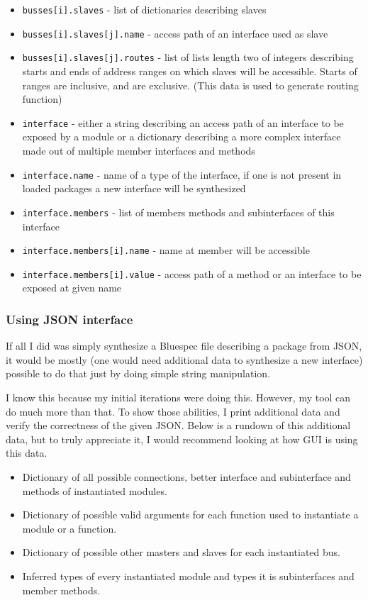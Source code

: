 \documentclass[12pt]{report}
\begin{document}
\begin{itemize}
   \item \verb!busses[i].slaves! - list of dictionaries describing slaves 
   \item \verb!busses[i].slaves[j].name! - access path of an interface used as slave 
   \item \verb!busses[i].slaves[j].routes! - list of lists length two of integers describing starts and ends of address ranges on which slaves will be accessible. Starts of ranges are inclusive, and are exclusive. (This data is used to generate routing function) 
   \item \verb!interface! - either a string describing an access path of an interface to be exposed by a module or a dictionary describing a more complex interface made out of multiple member interfaces and methods 
   \item \verb!interface.name! - name of a type of the interface, if one is not present in loaded packages a new interface will be synthesized 
   \item \verb!interface.members! - list of members methods and subinterfaces of this interface 
   \item \verb!interface.members[i].name! - name at member will be accessible 
   \item \verb!interface.members[i].value! - access path of a method or an interface to be exposed at given name  
\end{itemize} 


\subsubsection{Using JSON interface}

If all I did was simply synthesize a Bluespec file describing a package from JSON, it would be mostly (one would need additional data to synthesize a new interface) possible to do that just by doing simple string manipulation.

I know this because my initial iterations were doing this. However, my tool can do much more than that. To show those abilities, I print additional data and verify the correctness of the given JSON. Below is a rundown of this additional data, but to truly appreciate it, I would recommend looking at how GUI is using this data.

\begin{itemize}
\item Dictionary of all possible connections, better interface and subinterface and methods of instantiated modules.
\item Dictionary of possible valid arguments for each function used to instantiate a module or a function. 
\item Dictionary of possible other masters and slaves for each instantiated bus.
\item Inferred types of every instantiated module and types it is subinterfaces and member methods.
\end{itemize} 
\end{document}
